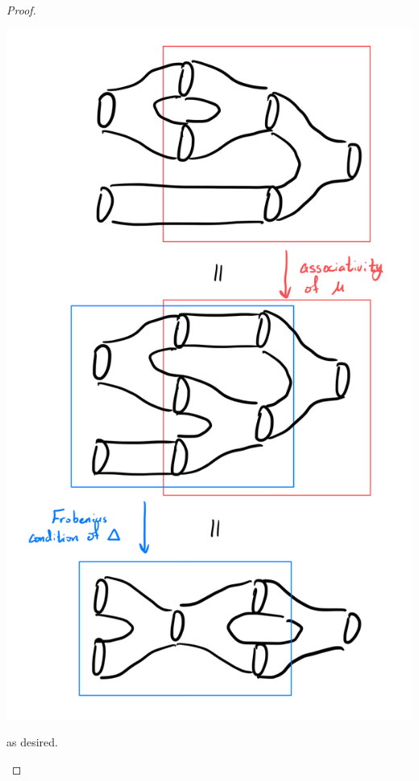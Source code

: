\documentclass[ 12pt ]{article}
\begin{document}
\begin{enumerate}
\begin{proof}
\begin{enumerate}
\begin{center}
					\includegraphics[scale=0.2]{equality2}
				\end{center}
				as desired.
			\end{enumerate}
		\end{proof}

\end{enumerate}
\end{document}
